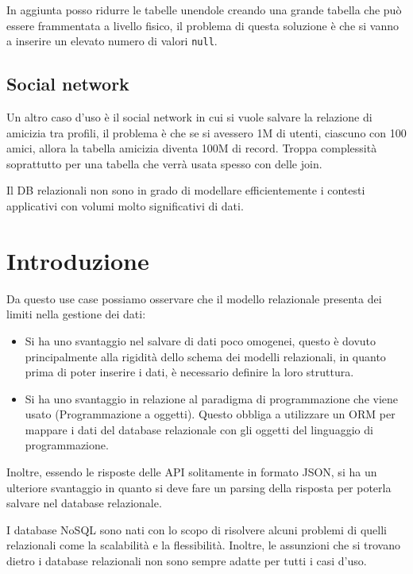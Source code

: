 In aggiunta posso ridurre le tabelle unendole creando una grande tabella che può
essere frammentata a livello fisico, il problema di questa soluzione è che si
vanno a inserire un elevato numero di valori \texttt{null}.
\subsection*{Social network}
Un altro caso d'uso è il social network in cui si vuole salvare la relazione di
amicizia tra profili, il problema è che se si avessero 1M di utenti, ciascuno con
100 amici, allora la tabella amicizia diventa 100M di record. Troppa complessità
soprattutto per una tabella che verrà usata spesso con delle join.

Il DB relazionali non sono in grado di modellare efficientemente i contesti applicativi
con volumi molto significativi di dati.
\section{Introduzione}
Da questo use case possiamo osservare che il modello relazionale presenta dei
limiti nella gestione dei dati:
\begin{itemize}
      \item Si ha uno svantaggio nel salvare di dati poco omogenei, questo è dovuto
            principalmente alla rigidità dello schema dei modelli relazionali, in
            quanto prima di poter inserire i dati, è necessario definire la loro
            struttura.
      \item Si ha uno svantaggio in relazione al paradigma di programmazione che
            viene usato (Programmazione a oggetti). Questo obbliga a utilizzare
            un ORM per mappare i dati del database relazionale con gli oggetti
            del linguaggio di programmazione.
\end{itemize}
Inoltre, essendo le risposte delle API solitamente in formato JSON, si ha un
ulteriore svantaggio in quanto si deve fare un parsing della risposta per
poterla salvare nel database relazionale.

I database NoSQL sono nati con lo scopo di risolvere alcuni problemi di quelli
relazionali come la scalabilità e la flessibilità. Inoltre, le assunzioni che
si trovano dietro i database relazionali non sono sempre adatte per tutti i
casi d'uso.

